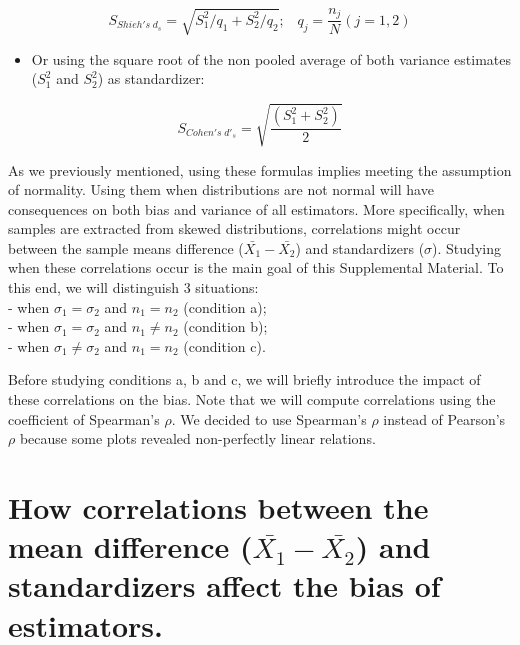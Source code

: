 \documentclass[
  man]{apa6}
\providecommand{\tightlist}{%
  \setlength{\itemsep}{0pt}\setlength{\parskip}{0pt}}
\begin{document}
\begin{equation} 
S_{Shieh's \; d_s} = \sqrt{S_1^2/q_1+S_2^2/q_2}; \;\;\; q_j=\frac{n_j}{N} (j=1,2)
\label{eq:Shiehds}
\end{equation}

\begin{itemize}
\tightlist
\item
  Or using the square root of the non pooled average of both variance estimates (\(S^2_1\) and \(S^2_2\)) as standardizer:
\end{itemize}

\begin{equation} 
S_{Cohen's \; d'_s} = \sqrt{\frac{\left(S^2_{1}+S^2_{2} \right)}{2}}
\label{eq:cohenprimeds}
\end{equation}

As we previously mentioned, using these formulas implies meeting the assumption of normality. Using them when distributions are not normal will have consequences on both bias and variance of all estimators. More specifically, when samples are extracted from skewed distributions, correlations might occur between the sample means difference (\(\bar{X_1}-\bar{X_2}\)) and standardizers (\(\sigma\)). Studying when these correlations occur is the main goal of this Supplemental Material. To this end, we will distinguish 3 situations:\\
- when \(\sigma_1=\sigma_2\) and \(n_1=n_2\) (condition a);\\
- when \(\sigma_1=\sigma_2\) and \(n_1\neq n_2\) (condition b);\\
- when \(\sigma_1 \neq \sigma_2\) and \(n_1 = n_2\) (condition c).

Before studying conditions a, b and c, we will briefly introduce the impact of these correlations on the bias. Note that we will compute correlations using the coefficient of Spearman's \(\rho\). We decided to use Spearman's \(\rho\) instead of Pearson's \(\rho\) because some plots revealed non-perfectly linear relations.

\hypertarget{how-correlations-between-the-mean-difference-barx_1-barx_2-and-standardizers-affect-the-bias-of-estimators.}{%
\section{\texorpdfstring{How correlations between the mean difference (\(\bar{X_1}-\bar{X_2}\)) and standardizers affect the bias of estimators.}{How correlations between the mean difference (\textbackslash bar\{X\_1\}-\textbackslash bar\{X\_2\}) and standardizers affect the bias of estimators.}}\label{how-correlations-between-the-mean-difference-barx_1-barx_2-and-standardizers-affect-the-bias-of-estimators.}}
\end{document}
